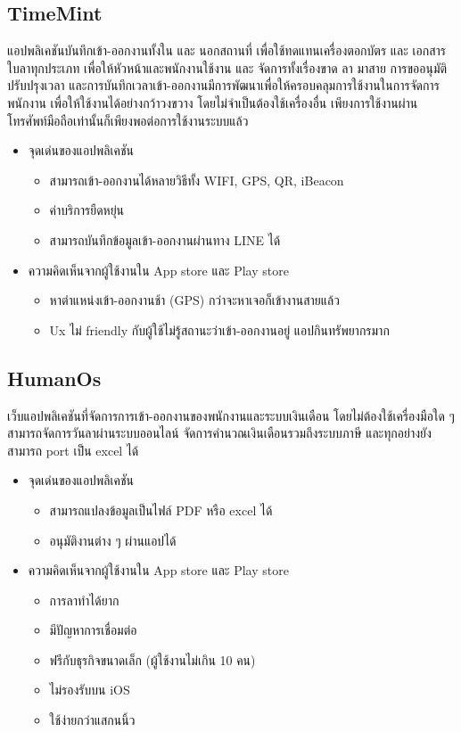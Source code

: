\subsection{TimeMint}
\quad แอปพลิเคชันบันทึกเข้า-ออกงานทั้งใน และ นอกสถานที่ เพื่อใช้ทดแทนเครื่องตอกบัตร และ เอกสารใบลาทุกประเภท 
เพื่อให้หัวหน้าและพนักงานใช้งาน และ จัดการทั้งเรื่องขาด ลา มาสาย การขออนุมัติปรับปรุงเวลา 
และการบันทึกเวลาเข้า-ออกงานมีการพัฒนาเพื่อให้ครอบคลุมการใช้งานในการจัดการพนักงาน 
เพื่อให้ใช้งานได้อย่างกว้าวงขวาง โดยไม่จำเป็นต้องใช้เครื่องอื่น เพียงการใช้งานผ่านโทรศัพท์มือถือเท่านั้นก็เพียงพอต่อการใช้งานระบบแล้ว  
\cite{timemint}
\begin{itemize}
  \item จุดเด่นของแอปพลิเคชัน
  \begin{itemize}
    \item สามารถเข้า-ออกงานได้หลายวิธีทั้ง WIFI, GPS, QR, iBeacon 
    \item ค่าบริการยืดหยุ่น 
    \item สามารถบันทึกข้อมูลเข้า-ออกงานผ่านทาง LINE ได้ 
  \end{itemize}
  \item ความคิดเห็นจากผู้ใช้งานใน App store และ Play store
  \begin{itemize}
    \item หาตำแหน่งเข้า-ออกงานช้า (GPS) กว่าจะหาเจอก็เข้างานสายแล้ว  
    \item Ux ไม่ friendly กับผู้ใช้ไม่รู้สถานะว่าเข้า-ออกงานอยู่ แอปกินทรัพยากรมาก 
  \end{itemize}
\end{itemize}

\subsection{HumanOs}
\quad เว็บแอปพลิเคชันที่จัดการการเข้า-ออกงานของพนักงานและระบบเงินเดือน 
โดยไม่ต้องใช้เครื่องมือใด ๆ สามารถจัดการวันลาผ่านระบบออนไลน์ 
จัดการคำนวณเงินเดือนรวมถึงระบบภาษี และทุกอย่างยังสามารถ port เป็น excel ได้  
\cite{humanos}
\begin{itemize}
  \item จุดเด่นของแอปพลิเคชัน
  \begin{itemize}
    \item สามารถแปลงข้อมูลเป็นไฟล์ PDF หรือ excel ได้ 
    \item อนุมัติงานต่าง ๆ ผ่านแอปได้ 
  \end{itemize}
  \item ความคิดเห็นจากผู้ใช้งานใน App store และ Play store
  \begin{itemize}
    \item การลาทำได้ยาก 
    \item มีปัญหาการเชื่อมต่อ 
    \item ฟรีกับธุรกิจขนาดเล็ก (ผู้ใช้งานไม่เกิน 10 คน) 
    \item ไม่รองรับบน iOS 
    \item ใช้ง่ายกว่าแสกนนิ้ว 
  \end{itemize}
\end{itemize}

